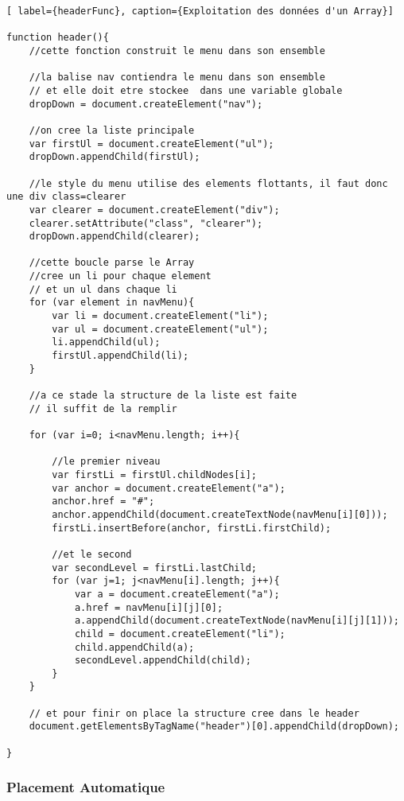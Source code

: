 \documentclass{scrartcl}
\begin{document}
\begin{lstlisting}[ label={headerFunc}, caption={Exploitation des données d'un Array}]

function header(){
    //cette fonction construit le menu dans son ensemble
    
    //la balise nav contiendra le menu dans son ensemble
    // et elle doit etre stockee  dans une variable globale
    dropDown = document.createElement("nav"); 
    
    //on cree la liste principale
    var firstUl = document.createElement("ul");
    dropDown.appendChild(firstUl);
    
    //le style du menu utilise des elements flottants, il faut donc une div class=clearer
    var clearer = document.createElement("div");
    clearer.setAttribute("class", "clearer");
    dropDown.appendChild(clearer);
    
    //cette boucle parse le Array
    //cree un li pour chaque element
    // et un ul dans chaque li
    for (var element in navMenu){
        var li = document.createElement("li");
        var ul = document.createElement("ul");
        li.appendChild(ul); 
        firstUl.appendChild(li);
    }
    
    //a ce stade la structure de la liste est faite
    // il suffit de la remplir
    
    for (var i=0; i<navMenu.length; i++){ 

        //le premier niveau
        var firstLi = firstUl.childNodes[i];
        var anchor = document.createElement("a");
        anchor.href = "#";
        anchor.appendChild(document.createTextNode(navMenu[i][0]));
        firstLi.insertBefore(anchor, firstLi.firstChild);
        
        //et le second
        var secondLevel = firstLi.lastChild;
        for (var j=1; j<navMenu[i].length; j++){
            var a = document.createElement("a");
            a.href = navMenu[i][j][0];
            a.appendChild(document.createTextNode(navMenu[i][j][1]));
            child = document.createElement("li");
            child.appendChild(a);
            secondLevel.appendChild(child);
        }
    }
    
    // et pour finir on place la structure cree dans le header
    document.getElementsByTagName("header")[0].appendChild(dropDown);
    
}
\end{lstlisting}


\subsubsection{Placement Automatique}
\end{document}
